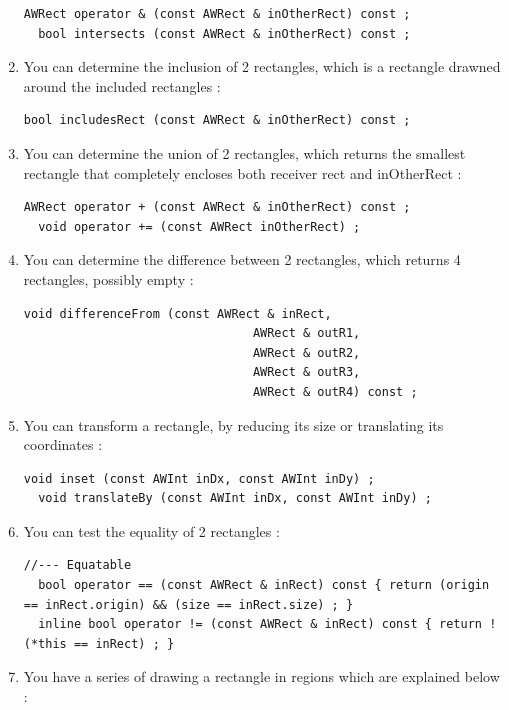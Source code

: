 \documentclass[a4paper,11pt]{extarticle}
\begin{document}
\begin{enumerate}
\begin{lstlisting}[language=Arduinonl]
  AWRect operator & (const AWRect & inOtherRect) const ;
  bool intersects (const AWRect & inOtherRect) const ;
\end{lstlisting}

\item You can determine the inclusion of 2 rectangles, which is a rectangle drawned around the included rectangles :

\begin{lstlisting}[language=Arduinonl]
  bool includesRect (const AWRect & inOtherRect) const ;
\end{lstlisting}

\item You can determine the union of 2 rectangles, which returns the smallest rectangle that completely encloses both receiver rect and inOtherRect :

\begin{lstlisting}[language=Arduinonl]
  AWRect operator + (const AWRect & inOtherRect) const ;
  void operator += (const AWRect inOtherRect) ;
\end{lstlisting}

\item You can determine the difference between 2 rectangles, which returns 4 rectangles, possibly empty :

\begin{lstlisting}[language=Arduinonl]
  void differenceFrom (const AWRect & inRect,
                                AWRect & outR1,
                                AWRect & outR2,
                                AWRect & outR3,
                                AWRect & outR4) const ;
\end{lstlisting}

\item You can transform a rectangle, by reducing its size or translating its coordinates :

\begin{lstlisting}[language=Arduinonl]
  void inset (const AWInt inDx, const AWInt inDy) ;
  void translateBy (const AWInt inDx, const AWInt inDy) ;
\end{lstlisting}

\item You can test the equality of 2 rectangles :

\begin{lstlisting}[language=Arduinonl]
//--- Equatable
  bool operator == (const AWRect & inRect) const { return (origin == inRect.origin) && (size == inRect.size) ; }
  inline bool operator != (const AWRect & inRect) const { return ! (*this == inRect) ; }
\end{lstlisting}

\item You have a series of  drawing a rectangle in regions which are explained below :
\end{enumerate}
\end{document}
